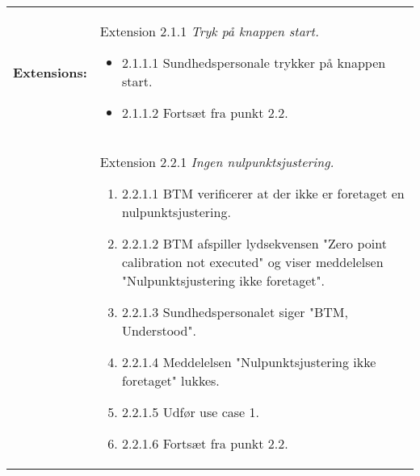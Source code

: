 \begin{table}[H]
\begin{tabular}{|l|p{10cm}|}
\\\hline
\textbf{Extensions:} & Extension 2.1.1 \textit{Tryk på knappen start.}
\begin{itemize}
\setlength\itemsep{0.1em}
\item[\labelname]2.1.1.1   Sundhedspersonale trykker på knappen start.
\item[\labelname]2.1.1.2   Fortsæt fra punkt 2.2. 
\end{itemize}
\\
& Extension 2.2.1 \textit{Ingen nulpunktsjustering.}
\begin{enumerate}
\setlength\itemsep{0.1em}
\item[\labelname]2.2.1.1   BTM verificerer at der ikke er foretaget en nulpunktsjustering. 
\item[\labelname]2.2.1.2   BTM afspiller lydsekvensen "Zero point calibration not executed" og viser meddelelsen "Nulpunktsjustering ikke foretaget". 
\item[\labelname]2.2.1.3   Sundhedspersonalet siger "BTM, Understood".
\item[\labelname]2.2.1.4   Meddelelsen "Nulpunktsjustering ikke foretaget" lukkes.
\item[\labelname]2.2.1.5   Udfør use case 1.
\item[\labelname]2.2.1.6   Fortsæt fra punkt 2.2. 
\end{enumerate}
\\\hline
\end{tabular}
\end{table}

